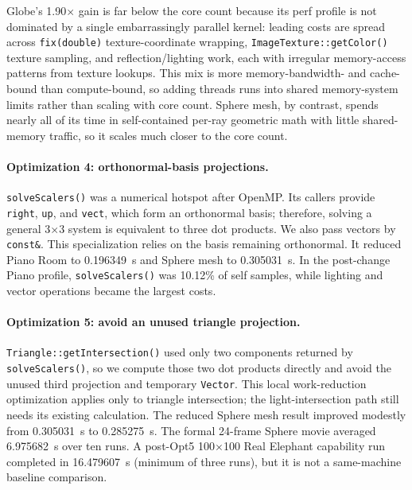 \documentclass[sigplan,screen]{acmart}
\begin{document}
Globe's 1.90$\times$ gain is far below the core count because its perf
profile is not dominated by a single embarrassingly parallel kernel: leading
costs are spread across \texttt{fix(double)} texture-coordinate wrapping,
\texttt{ImageTexture::getColor()} texture sampling, and reflection/lighting
work, each with irregular memory-access patterns from texture lookups. This
mix is more memory-bandwidth- and cache-bound than compute-bound, so adding
threads runs into shared memory-system limits rather than scaling with core
count. Sphere mesh, by contrast, spends nearly all of its time in
self-contained per-ray geometric math with little shared-memory traffic, so
it scales much closer to the core count.

\paragraph{Optimization 4: orthonormal-basis projections.}
\texttt{solveScalers()} was a numerical hotspot after OpenMP. Its callers
provide \texttt{right}, \texttt{up}, and \texttt{vect}, which form an
orthonormal basis; therefore, solving a general 3$\times$3 system is
equivalent to three dot products. We also pass vectors by \texttt{const\&}.
This specialization relies on the basis remaining orthonormal. It reduced
Piano Room to 0.196349~s and Sphere mesh to 0.305031~s. In the post-change
Piano profile, \texttt{solveScalers()} was 10.12\% of self samples, while
lighting and vector operations became the largest costs.

\paragraph{Optimization 5: avoid an unused triangle projection.}
\texttt{Triangle::getIntersection()} used only two components returned by
\texttt{solveScalers()}, so we compute those two dot products directly and
avoid the unused third projection and temporary \texttt{Vector}. This local
work-reduction optimization applies only to triangle intersection; the
light-intersection path still needs its existing calculation. The reduced
Sphere mesh result improved modestly from 0.305031~s to 0.285275~s. The
formal 24-frame Sphere movie averaged 6.975682~s over ten runs. A post-Opt5
100$\times$100 Real Elephant capability run completed in 16.479607~s
(minimum of three runs), but it is not a same-machine baseline comparison.
\end{document}
